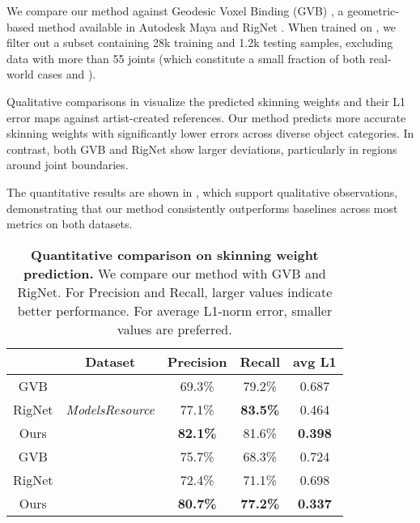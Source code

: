 We compare our method against Geodesic Voxel Binding (GVB) \cite{dionne2013geodesic}, a geometric-based method available in Autodesk Maya \cite{AutodeskMaya2024} and RigNet \cite{xu2020rignet}. 
When trained on \ourdata{}, we filter out a subset containing 28k training and 1.2k testing samples, excluding data with more than 55 joints (which constitute a small fraction of both real-world cases and \ourdata{}).

Qualitative comparisons in  visualize the predicted skinning weights and their L1 error maps against artist-created references. 
Our method predicts more accurate skinning weights with significantly lower errors across diverse object categories.
In contrast, both GVB and RigNet show larger deviations, particularly in regions around joint boundaries. 

The quantitative results are shown in , which support qualitative observations,
demonstrating that our method consistently outperforms baselines across most metrics on both datasets. 


\begin{table}
  \caption{\textbf{Quantitative comparison on skinning weight prediction.} We compare our method with GVB and RigNet. For Precision and Recall, larger values indicate better performance. For average L1-norm error, smaller values are preferred. }
  \vspace{-10pt}
  \label{comparison_skin}
  \centering
  \begin{tabular}{ccccc}
    \toprule
      & Dataset &  Precision  & Recall & avg L1 \\
    \midrule
    GVB &  \multirow{3}{*}{\textit{ModelsResource}}  & 69.3\%  & 79.2\%  & 0.687    \\
    RigNet  &  & 77.1\% & \textbf{83.5\%}  & 0.464  \\
    Ours     &   & \textbf{82.1{\%}} & 81.6{\%} & \textbf{0.398}      \\
    \midrule
    GVB  &\multirow{3}{*}{\textit{\ourdata{}}} & 75.7\% & 68.3\% & 0.724  \\
    RigNet & & 72.4\% & 71.1\%& 0.698    \\
    Ours   &   & \textbf{80.7{\%}} & \textbf{77.2{\%}} & \textbf{0.337}      \\
    \bottomrule
  \end{tabular}
  \vspace{-12pt}
\end{table}

